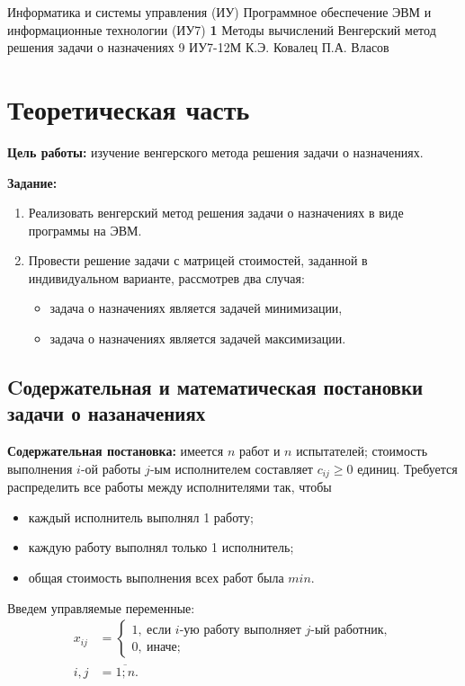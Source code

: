 \documentclass{bmstu}
\begin{document}
\makereporttitle
{Информатика и системы управления (ИУ)}
{Программное обеспечение ЭВМ и информационные технологии (ИУ7)}
{\textbf{1}}
{Методы вычислений}
{Венгерский метод решения задачи о назначениях}
{9}
{ИУ7-12М}
{К.Э. Ковалец}
{П.А. Власов}


\setcounter{page}{2}


\chapter{Теоретическая часть}

\textbf{Цель работы:} изучение венгерского метода решения задачи о назначениях.

\textbf{Задание:}
\begin{enumerate}
    \item Реализовать венгерский метод решения задачи о назначениях в виде программы на ЭВМ.
    \item Провести решение задачи с матрицей стоимостей, заданной в индивидуальном варианте, рассмотрев два случая:
    \begin{itemize}
        \item задача о назначениях является задачей минимизации,
        \item задача о назначениях является задачей максимизации.
    \end{itemize}
\end{enumerate}

\section{Cодержательная и математическая постановки задачи о назаначениях}

\textbf{Содержательная постановка:} имеется $n$ работ и $n$ испытателей; стоимость выполнения $i$-ой работы $j$-ым исполнителем составляет $c_{ij} \geqslant 0$ единиц. Требуется распределить все работы между исполнителями так, чтобы
\begin{itemize}
    \item каждый исполнитель выполнял 1 работу;
    \item каждую работу выполнял только 1 исполнитель;
    \item общая стоимость выполнения всех работ была $min$.
\end{itemize}

Введем управляемые переменные:
\begin{align}
    x_{ij} & =
    \begin{cases}
        1, \: \text{если $i$-ую работу выполняет $j$-ый работник}, \\
        0, \: \text{иначе};
    \end{cases} \nonumber \\
    i, j & = \overline{1; n}. 
\end{align}
\end{document}
